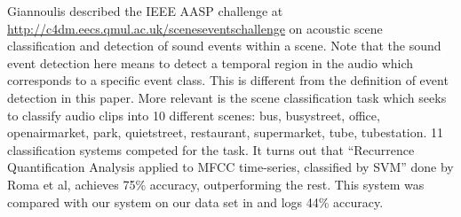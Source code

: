 Giannoulis \et{} described the IEEE AASP 
challenge at \url{http://c4dm.eecs.qmul.ac.uk/sceneseventschallenge} on 
acoustic scene classification and detection of sound events within a scene.
Note that the sound event detection here means to detect a temporal region
in the audio which corresponds to a specific event class. This is different
from the definition of event detection in this paper. More relevant is the
scene classification task which seeks to classify audio clips into 
10 different scenes: bus, busystreet, office, openairmarket, 
park, quietstreet, restaurant, supermarket, tube, tubestation. 11 classification
systems competed for the task. It turns out that ``Recurrence Quantification Analysis applied to MFCC time-series, classified by SVM'' done by Roma et al, 
achieves 75\% accuracy, outperforming the rest. This system was 
compared with our system on our data set in  and logs
44\% accuracy.  
